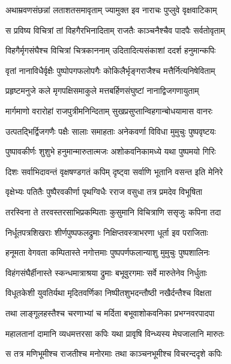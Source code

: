 \twolineshloka
{अथाम्रवणसंछन्नां लताशतसमावृताम्}
{ज्यामुक्त इव नाराचः पुप्लुवे वृक्षवाटिकाम्} %

\twolineshloka
{स प्रविष्य विचित्रां तां विहगैरभिनादिताम्}
{राजतैः काञ्चनैश्चैव पादपैः सर्वतोवृताम्} %

\twolineshloka
{विहगैर्मृगसंघैश्च विचित्रां चित्रकाननाम्}
{उदितादित्यसंकाशां ददर्श हनुमान्कपिः} %

\twolineshloka
{वृतां नानाविधैर्वृक्षैः पुष्पोपगफलोपगैः}
{कोकिलैर्भृङ्गराजैश्च मत्तैर्नित्यनिषेविताम्} %

\twolineshloka
{प्रहृष्टमनुजे कले मृगपक्षिसमाकुले}
{मत्तबर्हिणसंघुष्टां नानाद्विजगणायुताम्} %

\twolineshloka
{मार्गमाणो वरारोहां राजपुत्रीमनिन्दिताम्}
{सुखप्रसुप्तान्विहगान्बोधयामास वानरः} %

\twolineshloka
{उत्पतद्भिर्द्विजगणैः पक्षैः सालाः समाहताः}
{अनेकवर्णा विविधा मुमुचुः पुष्पवृष्टयः} %

\twolineshloka
{पुष्पावकीर्णः शुशुभे हनुमान्मारुतात्मजः}
{अशोकवनिकामध्ये यथा पुष्पमयो गिरिः} %

\twolineshloka
{दिशः सर्वाभिदावन्तं वृक्षषण्डगतं कपिम्}
{दृष्ट्वा सर्वाणि भूतानि वसन्त इति मेनिरे} %

\twolineshloka
{वृक्षेभ्यः पतितैः पुष्पैरवकीर्णा पृथग्विधैः}
{रराज वसुधा तत्र प्रमदेव विभूषिता} %

\twolineshloka
{तरस्विना ते तरवस्तरसाभिप्रकम्पिताः}
{कुसुमानि विचित्राणि ससृजुः कपिना तदा} %

\twolineshloka
{निर्धूतपत्रशिखराः शीर्णपुष्पफलद्रुमाः}
{निक्षिप्तवस्त्राभरणा धूर्ता इव पराजिताः} %

\twolineshloka
{हनूमता वेगवता कम्पितास्ते नगोत्तमाः}
{पुष्पपर्णफलान्याशु मुमुचुः पुष्पशालिनः} %

\twolineshloka
{विहंगसंघैर्हीनास्ते स्कन्धमात्राश्रया द्रुमाः}
{बभूवुरगमाः सर्वे मारुतेनेव निर्धुताः} %

\twolineshloka
{विधूतकेशी युवतिर्यथा मृदितवर्णिका}
{निष्पीतशुभदन्तौष्ठी नखैर्दन्तैश्च विक्षता} %

\twolineshloka
{तथा लाङ्गूलहस्तैश्च चरणाभ्यां च मर्दिता}
{बभूवाशोकवनिका प्रभग्नवरपादपा} %

\twolineshloka
{महालतानां दामानि व्यधमत्तरसा कपिः}
{यथा प्रावृषि विन्ध्यस्य मेघजालानि मारुतः} %

\twolineshloka
{स तत्र मणिभूमीश्च राजतीश्च मनोरमाः}
{तथा काञ्चनभूमीश्च विचरन्ददृशे कपिः} %

